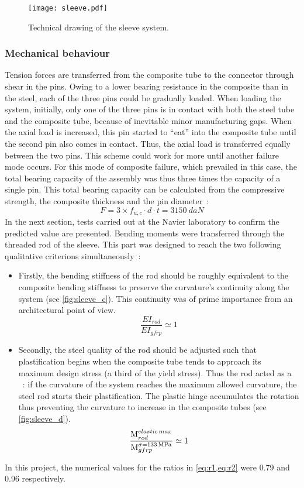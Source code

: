 \begin{figure}[ht]
	\centering
	\texttt{[image: sleeve.pdf]}
	\caption{Technical drawing of the sleeve system.}
	\label{fig:sleeve_dwg}
\end{figure}

\subsubsection{Mechanical behaviour}
Tension forces are transferred from the composite tube to the connector through shear in the pins. Owing to a lower bearing resistance in the composite than in the steel, each of the three pins could be gradually loaded. When loading the system, initially, only one of the three pins is in contact with both the steel tube and the composite tube, because of inevitable minor manufacturing gaps. When the axial load is increased, this pin started to “eat” into the composite tube until the second pin also comes in contact. Thus, the axial load is transferred equally between the two pins. This scheme could work for more until another failure mode occurs.
For this mode of composite failure, which prevailed in this case, the total bearing capacity of the assembly was thus three times the capacity of a single pin. This total bearing capacity can be calculated from the compressive strength, the composite thickness and the pin diameter~:
\begin{equation}
	F = 3 \times f_{u,c}\cdot d \cdot t = \SI{3150}{daN}
\end{equation}
In the next section, tests carried out at the Navier laboratory to confirm the predicted value are presented.
Bending moments were transferred through the threaded rod of the sleeve. This part was designed to reach the two following qualitative criterions simultaneously~:
\begin{itemize}
\item
Firstly, the bending stiffness of the rod should be roughly equivalent to the composite bending stiffness to preserve the curvature’s continuity along the system  (see \cref{fig:sleeve_c}). This continuity was of prime importance from an architectural point of view.
\begin{equation}
	\frac{EI_{rod}}{EI_{gfrp}} \simeq 1
	\label{eq:r1}
\end{equation}
\item
Secondly, the steel quality of the rod should be adjusted such that plastification begins when the composite tube tends to approach its maximum design stress (a third of the yield stress). Thus the rod acted as a ~: if the curvature of the system reaches the maximum allowed curvature, the steel rod starts their plastification. The plastic hinge accumulates the rotation thus preventing the curvature to increase in the composite tubes (see \cref{fig:sleeve_d}).
\begin{equation}
	\frac{\raisebox{0.2ex}M^{elastic\,max}_{rod}}{\raisebox{-0.2ex}M^{\sigma = \SI{133}{MPa}}_{gfrp}} \simeq 1
	\label{eq:r2}
\end{equation}
\end{itemize}
In this project, the numerical values for the ratios in \cref{eq:r1,eq:r2} were 0.79 and 0.96 respectively.

